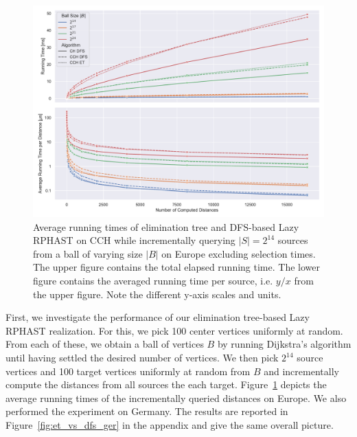 \documentclass[a4paper, english, cleveref]{lipics-v2021}
\begin{document}
\begin{figure}
\centering
\includegraphics[width=\linewidth]{fig/lazy_rphast_et_vs_dfs.pdf}
\caption{
Average running times of elimination tree and DFS-based Lazy RPHAST on CCH while incrementally querying $|S| = 2^{14}$ sources from a ball of varying size $|B|$ on Europe excluding selection times.
The upper figure contains the total elapsed running time.
The lower figure contains the averaged running time per source, i.e. $y/x$ from the upper figure.
Note the different y-axis scales and units.
}\label{fig:et_vs_dfs}
\end{figure}

First, we investigate the performance of our elimination tree-based Lazy RPHAST realization.
For this, we pick 100 center vertices uniformly at random.
From each of these, we obtain a ball of vertices $B$ by running Dijkstra's algorithm until having settled the desired number of vertices.
We then pick $2^{14}$ source vertices and 100 target vertices uniformly at random from $B$ and incrementally compute the distances from all sources the each target.
Figure~\ref{fig:et_vs_dfs} depicts the average running times of the incrementally queried distances on Europe.
We also performed the experiment on Germany.
The results are reported in Figure~\ref{fig:et_vs_dfs_ger} in the appendix and give the same overall picture.
\end{document}
